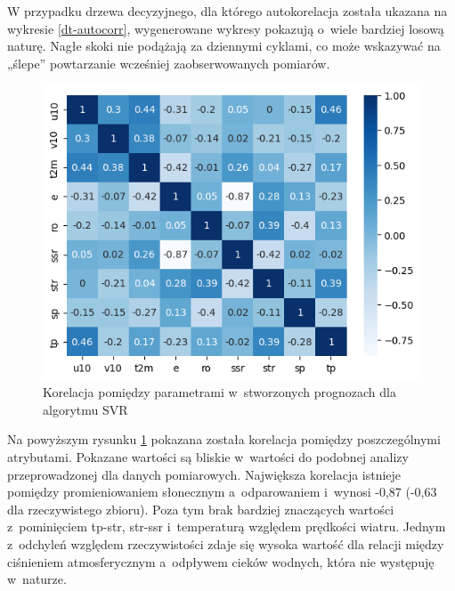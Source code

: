 W przypadku drzewa decyzyjnego, dla którego autokorelacja została ukazana na wykresie \ref{dt-autocorr},
wygenerowane wykresy pokazują o~wiele bardziej losową naturę. Nagłe skoki nie podążają za dziennymi cyklami,
co może wskazywać na „ślepe'' powtarzanie wcześniej zaobserwowanych pomiarów. 

\begin{figure}[H]
    \centering
    \includegraphics[width=\textwidth]{images/svr_corr_matrix.png}
    \caption[Korelacja dla SVR]{Korelacja pomiędzy parametrami w~stworzonych prognozach dla algorytmu SVR}
    \label{svr-corr-matrix}
\end{figure}

Na powyższym rysunku \ref{svr-corr-matrix} pokazana została korelacja pomiędzy poszczególnymi atrybutami.
Pokazane wartości są bliskie w~wartości do podobnej analizy przeprowadzonej dla danych pomiarowych. 
Największa korelacja istnieje pomiędzy promieniowaniem słonecznym a~odparowaniem i~wynosi -0,87 (-0,63 dla
rzeczywistego zbioru). Poza tym brak bardziej znaczących wartości z~pominięciem tp-str, str-ssr i~temperaturą
względem prędkości wiatru. Jednym z~odchyleń względem rzeczywistości zdaje się wysoka wartość dla 
relacji między ciśnieniem atmosferycznym a~odpływem cieków wodnych, która nie występuję w~naturze.

